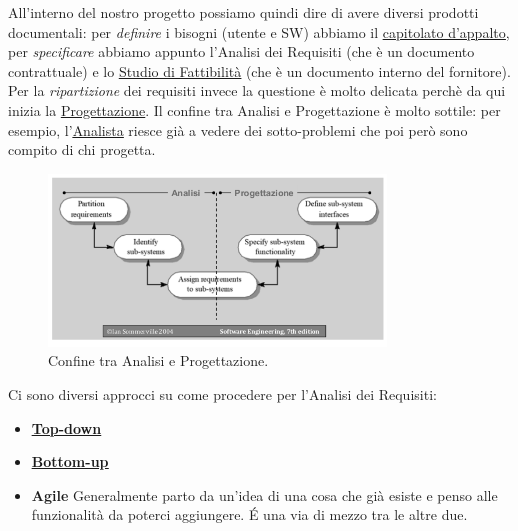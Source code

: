 		All'interno del nostro progetto possiamo quindi dire di avere diversi prodotti documentali: per \textit{definire} i bisogni (utente e SW) abbiamo il \underline{\hyperref[capitolati]{capitolato d'appalto}}, per \textit{specificare} abbiamo appunto l'Analisi dei Requisiti (che è un documento contrattuale) e lo \underline{\hyperref[studiofattibilita]{Studio di Fattibilità}} (che è un documento interno del fornitore). Per la \textit{ripartizione} dei requisiti invece la questione è molto delicata perchè da qui inizia la \underline{\hyperref[progettazione]{Progettazione}}. Il confine tra Analisi e Progettazione è molto sottile: per esempio, l'\underline{\hyperref[analista]{Analista}} riesce già a vedere dei sotto-problemi che poi però sono compito di chi progetta. 
		
		\begin{figure}[H]
			\centering
			\includegraphics[width=0.8\textwidth]{img/conf}		
			\caption{Confine tra Analisi e Progettazione.}
		\end{figure} 
		
		Ci sono diversi approcci su come procedere per l'Analisi dei Requisiti:
			\begin{itemize}
				\item \textbf{\underline{\hyperref[topdown]{Top-down}}}
				\item \textbf{\underline{\hyperref[bottomup]{Bottom-up}}}
				\item \textbf{Agile} \label{agile}
				Generalmente parto da un'idea di una cosa che già esiste e penso alle funzionalità da poterci aggiungere. É una via di mezzo tra le altre due.
			\end{itemize}	
		
